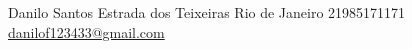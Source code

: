 \documentclass[verylight]{simplehipstercv}
\newlength{\rightcolwidth}
\begin{document}
\begin{paracol}{2}
\setlength{\parindent}{0pt}
\begin{minipage}[t]{\rightcolwidth}
\begin{center}\fontfamily{\sfdefault}\selectfont \color{black!70}
{\small Danilo Santos  Estrada dos Teixeiras  Rio de Janeiro  21985171171 \newline{} \protect\url{danilof123433@gmail.com}
}
\end{center}
\end{minipage}

\end{paracol}
\end{document}
